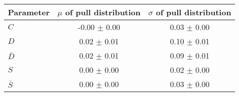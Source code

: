 \begin{tabular}{l  c  c}
\hline
Parameter & $\mu$ of pull distribution & $\sigma$ of pull distribution \\
\hline
\hline
$C$ & -0.00 $\pm$ 0.00 & 0.03 $\pm$ 0.00 \\
$D$ & 0.02 $\pm$ 0.01 & 0.10 $\pm$ 0.01 \\
$\bar{D}$ & 0.02 $\pm$ 0.01 & 0.09 $\pm$ 0.01 \\
$S$ & 0.00 $\pm$ 0.00 & 0.02 $\pm$ 0.00 \\
$\bar{S}$ & 0.00 $\pm$ 0.00 & 0.03 $\pm$ 0.00 \\
\hline
\end{tabular}
